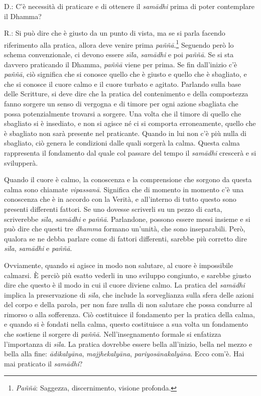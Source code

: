 D.: C'è necessità di praticare e di ottenere il \emph{samādhi} prima di
poter contemplare il Dhamma?

R.: Si può dire che è giusto da un punto di vista, ma se si parla
facendo riferimento alla pratica, allora deve venire prima
\emph{paññā}.\footnote{\emph{Paññā}: Saggezza, discernimento, visione
  profonda.} Seguendo però lo schema convenzionale, ci devono essere
\emph{sīla}, \emph{samādhi} e poi \emph{paññā}. Se si sta davvero
praticando il Dhamma, \emph{paññā} viene per prima. Se fin dall'inizio
c'è \emph{paññā}, ciò significa che si conosce quello che è giusto e
quello che è sbagliato, e che si conosce il cuore calmo e il cuore
turbato e agitato. Parlando sulla base delle Scritture, si deve dire che
la pratica del contenimento e della compostezza fanno sorgere un senso
di vergogna e di timore per ogni azione sbagliata che possa
potenzialmente trovarsi a sorgere. Una volta che il timore di quello che
sbagliato si è insediato, e non si agisce né ci si comporta
erroneamente, quello che è sbagliato non sarà presente nel praticante.
Quando in lui non c'è più nulla di sbagliato, ciò genera le condizioni
dalle quali sorgerà la calma. Questa calma rappresenta il fondamento dal
quale col passare del tempo il \emph{samādhi} crescerà e si svilupperà.

Quando il cuore è calmo, la conoscenza e la comprensione che sorgono da
questa calma sono chiamate \emph{vipassanā}. Significa che di momento in
momento c'è una conoscenza che è in accordo con la Verità, e all'interno
di tutto questo sono presenti differenti fattori. Se uno dovesse
scriverli su un pezzo di carta, scriverebbe \emph{sīla}, \emph{samādhi}
e \emph{paññā}. Parlandone, possono essere messi insieme e si può dire
che questi tre \emph{dhamma} formano un'unità, che sono inseparabili.
Però, qualora se ne debba parlare come di fattori differenti, sarebbe
più corretto dire \emph{sīla}, \emph{samādhi} e \emph{paññā}.

Ovviamente, quando si agisce in modo non salutare, al cuore è
impossibile calmarsi. È perciò più esatto vederli in uno sviluppo
congiunto, e sarebbe giusto dire che questo è il modo in cui il cuore
diviene calmo. La pratica del \emph{samādhi} implica la preservazione di
\emph{sīla}, che include la sorveglianza sulla sfera delle azioni del
corpo e della parola, per non fare nulla di non salutare che possa
condurre al rimorso o alla sofferenza. Ciò costituisce il fondamento per
la pratica della calma, e quando si è fondati nella calma, questo
costituisce a sua volta un fondamento che sostiene il sorgere di
\emph{paññā}. Nell'insegnamento formale si enfatizza l'importanza di
\emph{sīla}. La pratica dovrebbe essere bella all'inizio, bella nel
mezzo e bella alla fine: \emph{ādikalyāna}, \emph{majjhekalyāna},
\emph{pariyosānakalyāna}. Ecco com'è. Hai mai praticato il
\emph{samādhi}?

